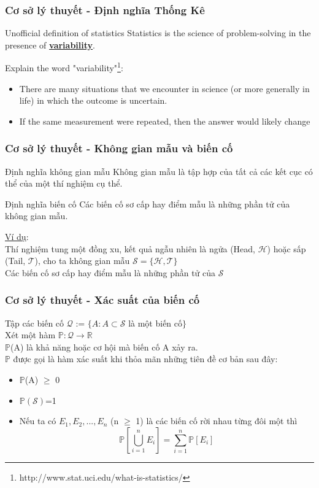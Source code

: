 \documentclass{beamer}
\begin{document}
\begin{frame}
\frametitle{Cơ sở lý thuyết - Định nghĩa Thống Kê}
\begin{block}{Unofficial definition of statistics}
Statistics is the science of problem-solving in the presence of \textbf{\underline{variability}}.
\end{block}
Explain the word "variability"\footnote{http://www.stat.uci.edu/what-is-statistics/}:
\begin{itemize}
\item There are many situations that we encounter in science (or more generally in life) in which the outcome is uncertain.
\item If the same measurement were repeated, then the answer would likely change
\end{itemize}
\end{frame}


\begin{frame}
\frametitle{Cơ sở lý thuyết - Không gian mẫu và biến cố}
\begin{block}{Định nghĩa không gian mẫu}
Không gian mẫu là tập hợp của tất cả các kết cục có thể của một thí nghiệm cụ thể.
\end{block}
\begin{block}{Định nghĩa biến cố}
Các biến cố sơ cấp hay điểm mẫu là những phần tử của không gian mẫu.
\end{block}
\underline{Ví dụ}:\\ 
Thí nghiệm tung một đồng xu, kết quả ngẫu nhiên là ngửa (Head, $\mathcal{H}$) hoặc sấp (Tail, $\mathcal{T}$), cho ta không gian mẫu $\mathcal{S= \{H,T}\}$\\
Các biến cố sơ cấp hay điểm mẫu là những phần tử của $\mathcal{S}$

\end{frame}



\begin{frame}[t]
\frametitle{Cơ sở lý thuyết - Xác suất của biến cố}
Tập các biến cố $\mathcal{Q}$ := $\{ A: A \subset \mathcal{S}$ là một biến cố$\}$\\
Xét một hàm $\mathbb{P}: \mathcal{Q} \rightarrow \mathbb{R}$\\
$\mathbb{P}$(A) là khả năng hoặc cơ hội mà biến cố A xảy ra.\\
$\mathbb{P}$ được gọi là hàm xác suất khi thỏa mãn những tiên đề cơ bản sau đây:\\
\begin{itemize}
\item $\mathbb{P}$(A) $\geq$ 0
\item $\mathbb{P}(\mathcal{S})$=1
\item Nếu ta có $E_{1}, E_{2},...,E_{n}$ (n $\geq$ 1) là các biến cố rời nhau từng đôi một thì\\
\[
\mathbb{P}\left[\bigcup_{i=1}^n E_{i}\right]=\sum_{i=1}^n \mathbb{P}[E_i]
\]
\end{itemize}
\end{frame}
\end{document}
